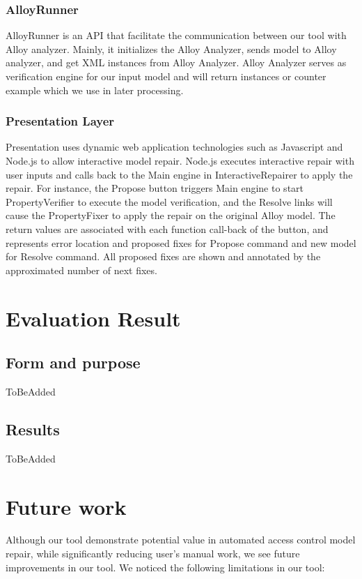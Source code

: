 \documentclass{acm_proc_article-sp}
\begin{document}
\subsubsection{AlloyRunner}
AlloyRunner is an API that facilitate the communication between our tool with Alloy analyzer. Mainly, it initializes the Alloy Analyzer, sends model to Alloy analyzer, and get XML instances from Alloy Analyzer. Alloy Analyzer serves as verification engine for our input model and will return instances or counter example which we use in later processing.

\subsubsection{Presentation Layer}
Presentation uses dynamic web application technologies such as Javascript and Node.js to allow interactive model repair. Node.js executes interactive repair with user inputs and calls back to the Main engine in InteractiveRepairer to apply the repair. For instance, the Propose button triggers Main engine to start PropertyVerifier to execute the model verification, and the Resolve links will cause the PropertyFixer to apply the repair on the original Alloy model. The return values are associated with each function call-back of the button, and represents error location and proposed fixes for Propose command and new model for Resolve command. All proposed fixes are shown and annotated by the approximated number of next fixes.

\section{Evaluation Result}

\subsection{Form and purpose}

ToBeAdded

\subsection{Results}
ToBeAdded

\section{Future work}

Although our tool demonstrate potential value in automated access control model repair, while significantly reducing user's manual work, we see future improvements in our tool. We noticed the following limitations in our tool:
\end{document}
